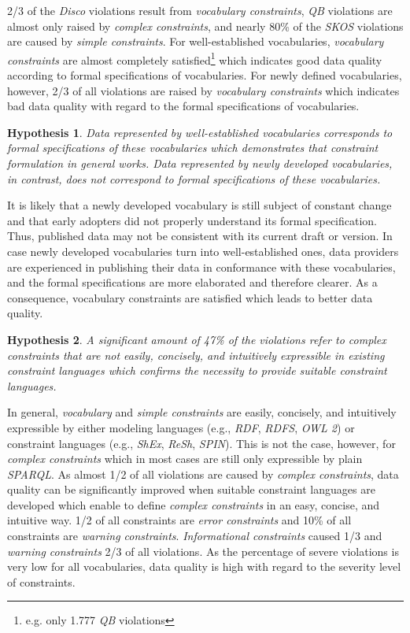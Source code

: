 \documentclass{llncs}
\newtheorem{hyp}{Hypothesis}
\begin{document}
{{2/3 of the \emph{Disco} violations result from \emph{vocabulary constraints},
\emph{QB} violations are almost only raised by \emph{complex constraints}, and 
nearly 80\% of the \emph{SKOS} violations are caused by \emph{simple constraints}.
For well-established vocabularies, \emph{vocabulary constraints} are almost completely satisfied\footnote{e.g. only 1.777 \emph{QB} violations} which indicates good data quality according to formal specifications of vocabularies.
For newly defined vocabularies, however, 2/3 of all violations are raised by \emph{vocabulary constraints}
which indicates bad data quality with regard to the formal specifications of vocabularies.

\begin{hyp}
Data represented by well-established vocabularies corresponds to formal specifications of these vocabularies which demonstrates that constraint formulation in general works. 
Data represented by newly developed vocabularies, in contrast, does not correspond to formal specifications of these vocabularies.
\end{hyp}

It is likely that a newly developed vocabulary is still subject of constant change
and that early adopters did not properly understand its formal specification.
Thus, published data may not be consistent with its current draft or version.
In case newly developed vocabularies turn into well-established ones,
data providers are experienced in publishing their data in conformance with these vocabularies, 
and the formal specifications are more elaborated and therefore clearer. 
As a consequence, vocabulary constraints are satisfied which leads to better data quality.  

\begin{hyp}
A significant amount of 47\% of the violations refer to complex constraints that are not easily, concisely, and intuitively expressible in existing constraint languages which confirms the necessity to provide suitable constraint languages.
\end{hyp} 
In general, \emph{vocabulary} and \emph{simple constraints} are easily, concisely, and intuitively expressible by either modeling languages (e.g., \emph{RDF}, \emph{RDFS}, \emph{OWL 2}) or constraint languages (e.g., \emph{ShEx}, \emph{ReSh}, \emph{SPIN}). 
This is not the case, however, for \emph{complex constraints} which in most cases are still only expressible by plain \emph{SPARQL}. 
As almost 1/2 of all violations are caused by \emph{complex constraints}, 
data quality can be significantly improved when suitable constraint languages are developed which enable to define \emph{complex constraints} in an easy, concise, and intuitive way.
1/2 of all constraints are \emph{error constraints} and
10\% of all constraints are \emph{warning constraints}.
\emph{Informational constraints} caused 1/3 and
\emph{warning constraints} 2/3 of all violations.
As the percentage of severe violations is very low for all vocabularies,
data quality is high with regard to the severity level of constraints.

}}
\end{document}
